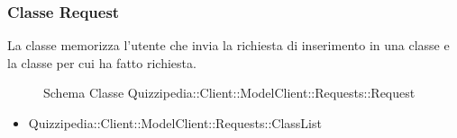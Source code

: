 \subsubsection{Classe Request}
La classe memorizza l'utente che invia la richiesta di inserimento in una classe e la classe per cui ha fatto richiesta.
\begin{figure}[H]
\centering
\noindent{}
\caption[Schema Classe Request]{Schema Classe Quizzipedia::Client::ModelClient::Requests::Request}
\end{figure}
\begin{itemize}
\item Quizzipedia::Client::ModelClient::Requests::ClassList
\end{itemize}
